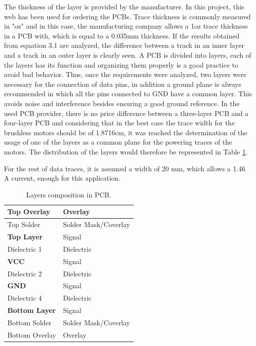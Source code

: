 The thickness of the layer is provided by the manufacturer. In this project, this web has been used for ordering the PCBs. \newline 
Trace thickness is commonly measured in "oz" and in this case, the manufacturing company allows a 1oz trace thickness in a PCB with, which is equal to a 0.035mm thickness.\newline
If the results obtained from equation 3.1 are analyzed, the difference between a track in an inner layer and a track in an outer layer is clearly seen.\newline
A PCB is divided into layers, each of the layers has its function and organizing them properly is a good practice to avoid bad behavior. Thus, once the requirements were analyzed, two layers were necessary for the connection of data pins, in addition a ground plane is always recommended in which all the pins connected to GND have a common layer. This avoids noise and interference besides ensuring a good ground reference. \newline
In the used PCB provider, there is no price difference between a three-layer PCB and a four-layer PCB and considering that in the best case the trace width for the brushless motors should be of 1.8716cm, it was reached the determination of the usage of one of the layers as a common plane for the powering traces of the motors. The distribution of the layers would therefore be represented in Table \ref{tabla:layers_altium}.

For the rest of data traces, it is assumed a width of 20 mm, which allows a 1.46 A current, enough for this application.


\renewcommand\tablename{Table}
\begin{table}[H]
	\centering
	
	\begin{tabular}{|l|l|}
		\hline
		Top Overlay           & Overlay              \\ \hline
		Top Solder            & Solder Mask/Coverlay \\ \hline
		\textbf{Top Layer}    & Signal               \\ \hline
		Dielectric 1          & Dielectric           \\ \hline
		\textbf{VCC}          & Signal               \\ \hline
		Dielectric 2          & Dielectric           \\ \hline
		\textbf{GND}          & Signal               \\ \hline
		Dielectric 4          & Dielectric           \\ \hline
		\textbf{Bottom Layer} & Signal               \\ \hline
		Bottom Solder         & Solder Mask/Coverlay \\ \hline
		Bottom Overlay        & Overlay              \\ \hline
	\end{tabular}
	\caption{Layers composition in PCB.}
	\label{tabla:layers_altium}
\end{table}



